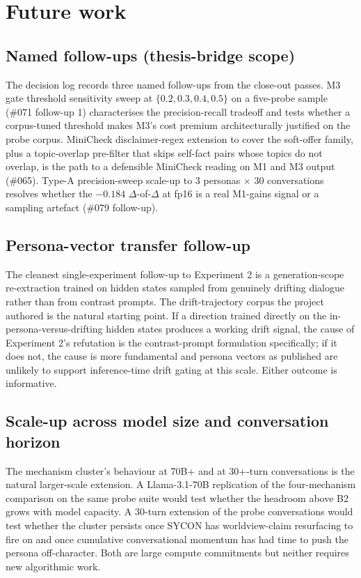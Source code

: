 \section{Future work}

\subsection{Named follow-ups (thesis-bridge scope)}

The decision log records three named follow-ups from the close-out passes. M3 gate threshold sensitivity sweep at $\{0.2, 0.3, 0.4, 0.5\}$ on a five-probe sample (\#071 follow-up 1) characterises the precision-recall tradeoff and tests whether a corpus-tuned threshold makes M3's cost premium architecturally justified on the probe corpus. MiniCheck disclaimer-regex extension to cover the soft-offer family, plus a topic-overlap pre-filter that skips self-fact pairs whose topics do not overlap, is the path to a defensible MiniCheck reading on M1 and M3 output (\#065). Type-A precision-sweep scale-up to 3 personas $\times$ 30 conversations resolves whether the $-0.184$ $\Delta$-of-$\Delta$ at fp16 is a real M1-gains signal or a sampling artefact (\#079 follow-up).

\subsection{Persona-vector transfer follow-up}

The cleanest single-experiment follow-up to Experiment 2 is a generation-scope re-extraction trained on hidden states sampled from genuinely drifting dialogue rather than from contrast prompts. The drift-trajectory corpus the project authored is the natural starting point. If a direction trained directly on the in-persona-versus-drifting hidden states produces a working drift signal, the cause of Experiment 2's refutation is the contrast-prompt formulation specifically; if it does not, the cause is more fundamental and persona vectors as published are unlikely to support inference-time drift gating at this scale. Either outcome is informative.

\subsection{Scale-up across model size and conversation horizon}

The mechanism cluster's behaviour at 70B+ and at 30+-turn conversations is the natural larger-scale extension. A Llama-3.1-70B replication of the four-mechanism comparison on the same probe suite would test whether the headroom above B2 grows with model capacity. A 30-turn extension of the probe conversations would test whether the cluster persists once SYCON has worldview-claim resurfacing to fire on and once cumulative conversational momentum has had time to push the persona off-character. Both are large compute commitments but neither requires new algorithmic work.

